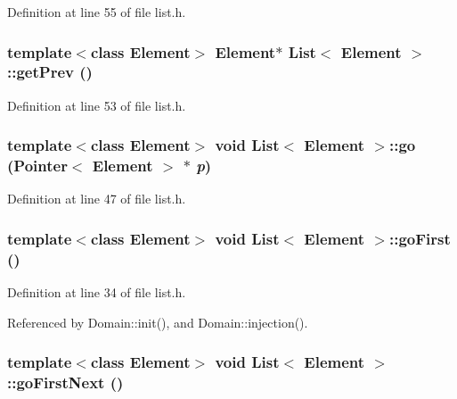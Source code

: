 Definition at line 55 of file list.h.\hypertarget{classList_b0424d273b7072f2b7381232590b3f37}{
\subsubsection[{getPrev}]{\setlength{\rightskip}{0pt plus 5cm}template$<$class Element$>$ Element$\ast$ {\bf List}$<$ Element $>$::getPrev ()}}
\label{classList_b0424d273b7072f2b7381232590b3f37}




Definition at line 53 of file list.h.\hypertarget{classList_cef5fb9410906f968eefb7f4af8c9d05}{
\subsubsection[{go}]{\setlength{\rightskip}{0pt plus 5cm}template$<$class Element$>$ void {\bf List}$<$ Element $>$::go ({\bf Pointer}$<$ Element $>$ $\ast$ {\em p})}}
\label{classList_cef5fb9410906f968eefb7f4af8c9d05}




Definition at line 47 of file list.h.\hypertarget{classList_6157f161c709d4ffea0e021d99c212cd}{
\subsubsection[{goFirst}]{\setlength{\rightskip}{0pt plus 5cm}template$<$class Element$>$ void {\bf List}$<$ Element $>$::goFirst ()}}
\label{classList_6157f161c709d4ffea0e021d99c212cd}




Definition at line 34 of file list.h.

Referenced by Domain::init(), and Domain::injection().\hypertarget{classList_e3565e27cc863240e43808e7278dad2f}{
\subsubsection[{goFirstNext}]{\setlength{\rightskip}{0pt plus 5cm}template$<$class Element$>$ void {\bf List}$<$ Element $>$::goFirstNext ()}}
\label{classList_e3565e27cc863240e43808e7278dad2f}




